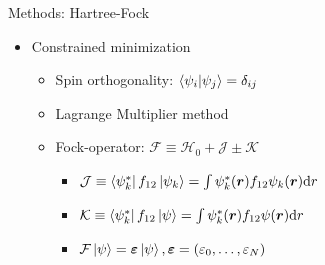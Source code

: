 \documentclass[10pt, t, xcolor=dvipsnames]{beamer}
\begin{document}
{{\begin{frame}[fragile]{Methods: Hartree-Fock}
    \begin{itemize}
        \item Constrained minimization
            \begin{itemize}
                \item Spin orthogonality: $\braket{\psi_i}{\psi_j} =
                    \delta_{ij}$
                \item Lagrange Multiplier method
                \item Fock-operator: $\mathcal{F} \equiv \mathcal{H}_0 +
                    \mathcal{J} \pm \mathcal{K}$
                    \begin{itemize}
                        \item $\mathcal{J} \equiv
                            \bra{\psi^{*}_k}f_{12}\ket{\psi_k} = \int
                            \psi^{*}_k(\bm{{r}})f_{12}\psi_k(\bm{{r}})\mathrm{d} r$
                        \vsp
                        \item $\mathcal{K} \equiv
                            \bra{\psi^{*}_k}f_{12}\ket{\psi} = \int
                            \psi^{*}_k(\bm{{r}})f_{12}\psi(\bm{{r}})\mathrm{d} r$
                        \vsp
                        \item $\mathcal{F}\ket{\psi} = \bm{{\varepsilon}}\ket{\psi},
                            \bm{{\varepsilon}}=(\varepsilon_0,\dots,\varepsilon_N)$
                    \end{itemize}
            \end{itemize}
    \end{itemize}
\end{frame}

}}
\end{document}

